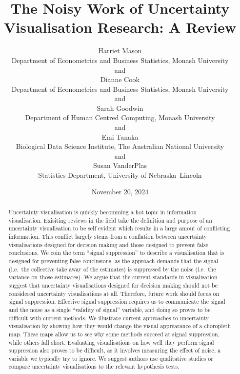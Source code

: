 \documentclass[
  12pt]{article}
\begin{document}
\def\spacingset#1{\renewcommand{\baselinestretch}%
{#1}\small\normalsize} \spacingset{1}



\date{November 20, 2024}
\title{\bf The Noisy Work of Uncertainty Visualisation Research: A
Review}
\author{
Harriet Mason\\
Department of Econometrics and Business Statistics, Monash University\\
and\\Dianne Cook\\
Department of Econometrics and Business Statistics, Monash University\\
and\\Sarah Goodwin\\
Department of Human Centred Computing, Monash University\\
and\\Emi Tanaka\\
Biological Data Science Institute, The Australian National University\\
and\\Susan VanderPlas\\
Statistics Department, University of Nebraska--Lincoln\\
}
\maketitle

\bigskip
\bigskip
\begin{abstract}
Uncertainty visualisation is quickly becomming a hot topic in
information visualisation. Exisiting reviews in the field take the
definition and purpose of an uncertainty visualisation to be self
evident which results in a large amout of conflicting information. This
conflict largely stems from a conflation between uncertainty
visualisations designed for decision making and those designed to
prevent false conclusions. We coin the term ``signal suppression'' to
describe a visualisation that is designed for preventing false
conclusions, as the approach demands that the signal (i.e.~the
collective take away of the estimates) is suppressed by the noise
(i.e.~the variance on those estimates). We argue that the current
standards in visualisation suggest that uncertainty visualisations
designed for decision making should not be considered uncertainty
visualisations at all. Therefore, future work should focus on signal
suppression. Effective signal suppression requires us to communicate the
signal and the noise as a single ``validity of signal'' variable, and
doing so proves to be difficult with current methods. We illustrate
current approaches to uncertainty visualisation by showing how they
would change the visual apprearance of a choropleth map. These maps
allow us to see why some methods succeed at signal suppression, while
others fall short. Evaluating visualisations on how well they perform
signal suppression also proves to be difficult, as it involves measuring
the effect of noise, a variable we typically try to ignore. We suggest
authors use qualitative studies or compare uncertainty visualisations to
the relevant hypothesis tests.
\end{abstract}
\end{document}
